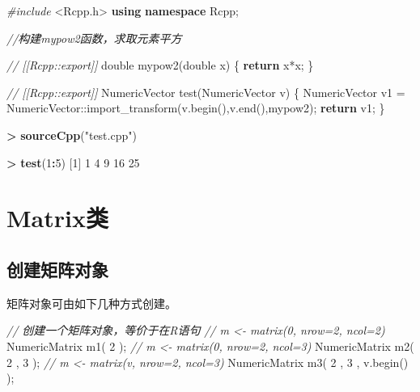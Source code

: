 \documentclass[]{ctexbook}
\newenvironment{Shaded}{\begin{snugshade}}{\end{snugshade}}
\newcommand{\KeywordTok}[1]{\textcolor[rgb]{0.13,0.29,0.53}{\textbf{#1}}}
\newcommand{\DataTypeTok}[1]{\textcolor[rgb]{0.13,0.29,0.53}{#1}}
\newcommand{\DecValTok}[1]{\textcolor[rgb]{0.00,0.00,0.81}{#1}}
\newcommand{\StringTok}[1]{\textcolor[rgb]{0.31,0.60,0.02}{#1}}
\newcommand{\ImportTok}[1]{#1}
\newcommand{\CommentTok}[1]{\textcolor[rgb]{0.56,0.35,0.01}{\textit{#1}}}
\newcommand{\ControlFlowTok}[1]{\textcolor[rgb]{0.13,0.29,0.53}{\textbf{#1}}}
\newcommand{\OperatorTok}[1]{\textcolor[rgb]{0.81,0.36,0.00}{\textbf{#1}}}
\newcommand{\PreprocessorTok}[1]{\textcolor[rgb]{0.56,0.35,0.01}{\textit{#1}}}
\newcommand{\NormalTok}[1]{#1}
\begin{document}
\begin{Shaded}
\begin{Highlighting}[]
\PreprocessorTok{#include }\ImportTok{<Rcpp.h>}
\KeywordTok{using} \KeywordTok{namespace}\NormalTok{ Rcpp;}

\CommentTok{//构建mypow2函数，求取元素平方}

\CommentTok{// [[Rcpp::export]]}
\DataTypeTok{double}\NormalTok{ mypow2(}\DataTypeTok{double}\NormalTok{ x) \{}
  \ControlFlowTok{return}\NormalTok{ x*x;}
\NormalTok{\}}

\CommentTok{// [[Rcpp::export]]}
\NormalTok{NumericVector test(NumericVector v) \{}
\NormalTok{    NumericVector v1 = NumericVector::import_transform(v.begin(),v.end(),mypow2);}
  \ControlFlowTok{return}\NormalTok{ v1;}
\NormalTok{\}}
\end{Highlighting}
\end{Shaded}

\begin{Shaded}
\begin{Highlighting}[]
\OperatorTok{>}\StringTok{ }\KeywordTok{sourceCpp}\NormalTok{(}\StringTok{"test.cpp"}\NormalTok{)}

\OperatorTok{>}\StringTok{ }\KeywordTok{test}\NormalTok{(}\DecValTok{1}\OperatorTok{:}\DecValTok{5}\NormalTok{)}
\NormalTok{[}\DecValTok{1}\NormalTok{]  }\DecValTok{1}  \DecValTok{4}  \DecValTok{9} \DecValTok{16} \DecValTok{25}
\end{Highlighting}
\end{Shaded}

\chapter{Matrix类}\label{matrix}

\section{创建矩阵对象}\label{Creating-Matrix-object}

矩阵对象可由如下几种方式创建。

\begin{Shaded}
\begin{Highlighting}[]
\CommentTok{// 创建一个矩阵对象，等价于在R语句}
\CommentTok{// m <- matrix(0, nrow=2, ncol=2)}
\NormalTok{NumericMatrix m1( }\DecValTok{2}\NormalTok{ );}
\CommentTok{// m <- matrix(0, nrow=2, ncol=3)}
\NormalTok{NumericMatrix m2( }\DecValTok{2}\NormalTok{ , }\DecValTok{3}\NormalTok{ );}
\CommentTok{// m <- matrix(v, nrow=2, ncol=3)}
\NormalTok{NumericMatrix m3( }\DecValTok{2}\NormalTok{ , }\DecValTok{3}\NormalTok{ , v.begin() );}
\end{Highlighting}
\end{Shaded}
\end{document}
